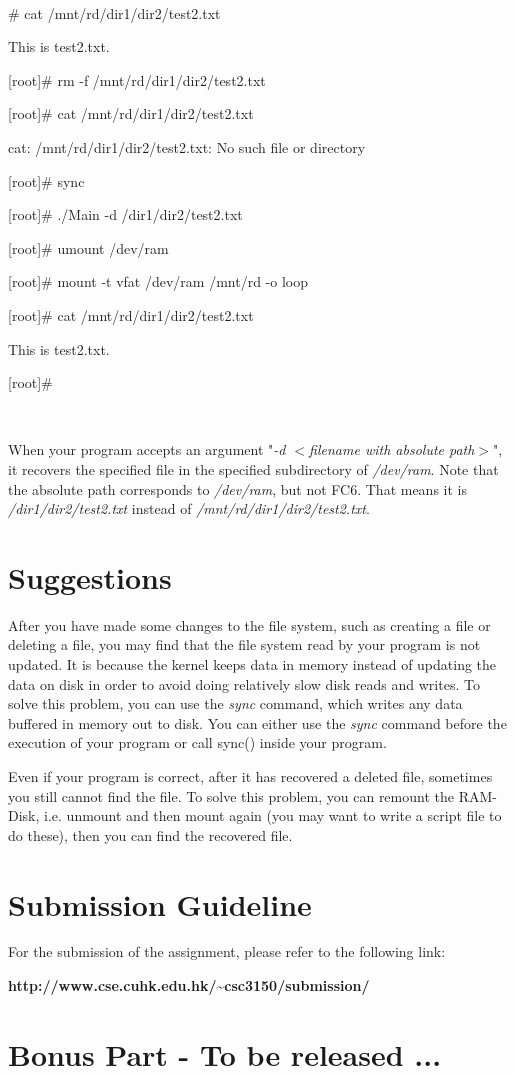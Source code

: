 \documentclass[a4paper,12pt]{article}
\begin{document}
~

\begin{tt}
[root]\# cat /mnt/rd/dir1/dir2/test2.txt

This is test2.txt.

[root]\# rm -f /mnt/rd/dir1/dir2/test2.txt

[root]\# cat /mnt/rd/dir1/dir2/test2.txt

cat: /mnt/rd/dir1/dir2/test2.txt: No such file or directory

[root]\# sync

[root]\# ./Main -d /dir1/dir2/test2.txt

[root]\# umount /dev/ram

[root]\# mount -t vfat /dev/ram /mnt/rd -o loop

[root]\# cat /mnt/rd/dir1/dir2/test2.txt

This is test2.txt.

[root]\#

\end{tt}

~

When your program accepts an argument "\textit{-d $<$filename with absolute path$>$}", it recovers the specified file in the specified subdirectory of \textit{/dev/ram}. Note that the absolute path corresponds to \textit{/dev/ram}, but not FC6. That means it is \textit{/dir1/dir2/test2.txt} instead of \textit{/mnt/rd/dir1/dir2/test2.txt}.

\section*{Suggestions}

After you have made some changes to the file system, such as creating a file or deleting a file, you may find that the file system read by your program is not updated. It is because the kernel keeps data in memory instead of updating the data on disk in order to avoid doing relatively slow disk reads and writes. To solve this problem, you can use the \textit{sync} command, which writes any data buffered in memory out to disk. You can either use the \textit{sync} command before the execution of your program or call sync() inside your program.

Even if your program is correct, after it has recovered a deleted file, sometimes you still cannot find the file. To solve this problem, you can remount the RAM-Disk, i.e. unmount and then mount again (you may want to write a script file to do these), then you can find the recovered file.

\section*{Submission Guideline}

For the submission of the assignment, please refer to the following
link:
\begin{center}
{\bf http://www.cse.cuhk.edu.hk/\~{}csc3150/submission/}
\end{center}


\section*{Bonus Part - To be released ...}
\end{document}
